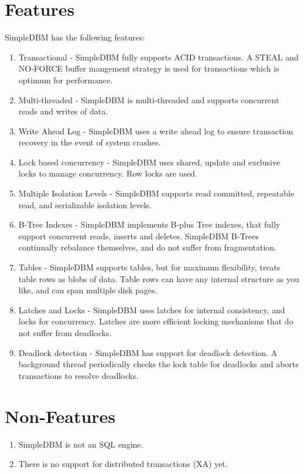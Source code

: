 \documentclass[a4paper,draft,oneside]{book}
\begin{document}
\section{Features}
SimpleDBM has the following features:
\begin{enumerate}
    \item Transactional - SimpleDBM fully supports ACID transactions. A STEAL and NO-FORCE buffer mangement strategy is used for transactions which is optimum for performance.
    \item Multi-threaded - SimpleDBM is multi-threaded and supports concurrent reads and writes of data.
    \item Write Ahead Log - SimpleDBM uses a write ahead log to ensure transaction recovery in the event of system crashes.
    \item Lock based concurrency - SimpleDBM uses shared, update and exclusive locks to manage concurrency. Row locks are used.
    \item Multiple Isolation Levels - SimpleDBM supports read committed, repeatable read, and serializable isolation levels.
    \item B-Tree Indexes - SimpleDBM implements B-plus Tree indexes, that fully support concurrent reads, inserts and deletes. SimpleDBM B-Trees continually rebalance themselves, and do not suffer from fragmentation.
    \item Tables - SimpleDBM supports tables, but for maximum flexibility, treats table rows as blobs of data. Table rows can have any internal structure as you like, and can span multiple disk pages.
    \item Latches and Locks - SimpleDBM uses latches for internal consistency, and locks for concurrency. Latches are more efficient locking mechanisms that do not suffer from deadlocks.
    \item Deadlock detection - SimpleDBM has support for deadlock detection. A background thread periodically checks the lock table for deadlocks and aborts transactions to resolve deadlocks.
\end{enumerate}

\section{Non-Features}
\begin{enumerate}
\item SimpleDBM is not an SQL engine. 
\item There is no support for distributed transactions (XA) yet.
\end{enumerate}
\end{document}
